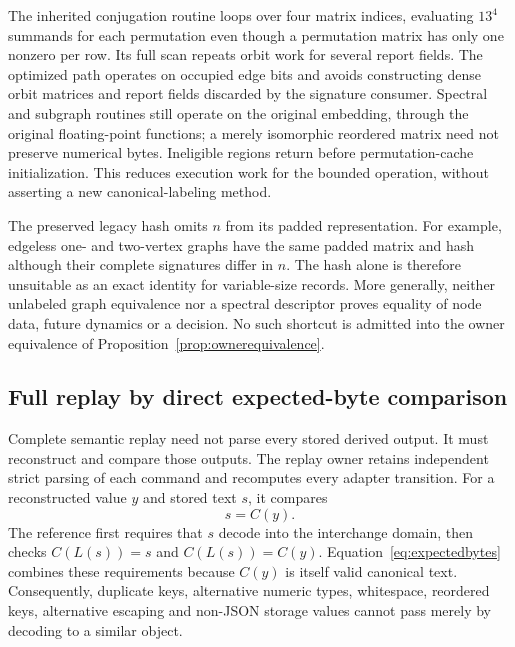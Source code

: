 \documentclass[11pt,a4paper]{article}
\theoremstyle{definition}\newtheorem{definition}[theorem]{Definition}
\begin{document}
The inherited conjugation routine loops over four matrix indices, evaluating $13^4$ summands for each permutation even though a permutation matrix has only one nonzero per row. Its full scan repeats orbit work for several report fields. The optimized path operates on occupied edge bits and avoids constructing dense orbit matrices and report fields discarded by the signature consumer. Spectral and subgraph routines still operate on the original embedding, through the original floating-point functions; a merely isomorphic reordered matrix need not preserve numerical bytes. Ineligible regions return before permutation-cache initialization. This reduces execution work for the bounded operation, without asserting a new canonical-labeling method.

The preserved legacy hash omits $n$ from its padded representation. For example, edgeless one- and two-vertex graphs have the same padded matrix and hash although their complete signatures differ in $n$. The hash alone is therefore unsuitable as an exact identity for variable-size records. More generally, neither unlabeled graph equivalence nor a spectral descriptor proves equality of node data, future dynamics or a decision. No such shortcut is admitted into the owner equivalence of Proposition~\ref{prop:ownerequivalence}.

\subsection{Full replay by direct expected-byte comparison}\label{sec:replayowner}
Complete semantic replay need not parse every stored derived output. It must reconstruct and compare those outputs. The replay owner retains independent strict parsing of each command and recomputes every adapter transition. For a reconstructed value $y$ and stored text $s$, it compares
\begin{equation}\label{eq:expectedbytes}
 s=C(y).
\end{equation}
The reference first requires that $s$ decode into the interchange domain, then checks $C(L(s))=s$ and $C(L(s))=C(y)$. Equation~\eqref{eq:expectedbytes} combines these requirements because $C(y)$ is itself valid canonical text. Consequently, duplicate keys, alternative numeric types, whitespace, reordered keys, alternative escaping and non-JSON storage values cannot pass merely by decoding to a similar object.
\end{document}
